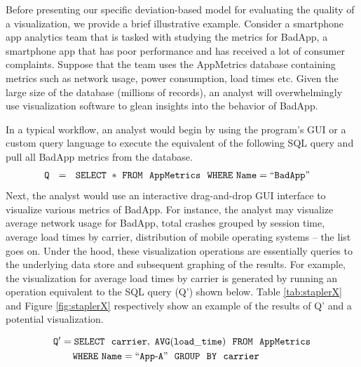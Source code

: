 Before presenting our specific deviation-based model for evaluating the quality of a visualization, we provide a brief illustrative example.
Consider a smartphone app analytics team that is tasked with studying the metrics for BadApp, a smartphone app that has
poor performance and has received a lot of consumer complaints. 
Suppose that the team uses the AppMetrics database containing metrics such as network usage, 
power consumption, load times etc.
Given the large size of the database (millions of records), an analyst will 
overwhelmingly use visualization software to glean insights into the behavior of BadApp.

In a typical workflow, an analyst would begin by using the program's GUI or a custom query language to execute the equivalent
of the following SQL query and pull all BadApp metrics from the database. 
\noindent 
\begin{align*}
& \tt Q \ \ = \ \ SELECT \ * \ FROM \ \  AppMetrics \ \ WHERE  \ Name=``BadApp"
\end{align*}
Next, the analyst would use an interactive drag-and-drop GUI interface to visualize various metrics of BadApp.
For instance, the analyst may visualize average network usage for BadApp, total crashes grouped by session time,
average load times by carrier, distribution of mobile operating systems -- the list goes on.
Under the hood, these visualization operations are essentially queries to the underlying data store and subsequent graphing of 
the results.
For example, the visualization for average load times by carrier is generated by running an operation equivalent to the
SQL query (Q') shown below.
Table \ref{tab:staplerX} and Figure \ref{fig:staplerX} respectively show an example of the results of Q' and a potential
visualization.

\noindent
\begin{align*}
& \tt Q' = SELECT \ \ carrier,\ AVG(load\_time) \ \ FROM \ \  AppMetrics \\
& \tt \hspace{20pt} WHERE\ Name=``App\text{-}A" \ \ GROUP  \ \ BY \ \ carrier
\end{align*}

